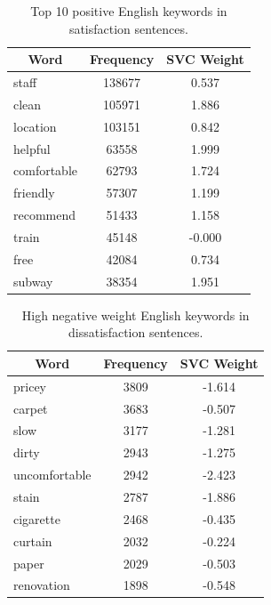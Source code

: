 \begin{table}[hbp]
\centering
\caption{Top 10 positive English keywords in satisfaction sentences.}
\label{tab:pos_keys_en}
\begin{tabular}{|l|c|c|}
\hline
\multicolumn{1}{|c|}{\textbf{Word}} & \textbf{Frequency} & \textbf{SVC Weight} \\ \hline
staff & 138677 & 0.537 \\ \hline
clean & 105971 & 1.886 \\ \hline
location & 103151 & 0.842 \\ \hline
helpful & 63558 & 1.999 \\ \hline
comfortable & 62793 & 1.724 \\ \hline
friendly & 57307 & 1.199 \\ \hline
recommend & 51433 & 1.158 \\ \hline
train & 45148 & -0.000 \\ \hline
free & 42084 & 0.734 \\ \hline
subway & 38354 & 1.951 \\ \hline
\end{tabular}
\end{table}


\begin{table}[hbp]
\centering
\caption{High negative weight English keywords in dissatisfaction sentences.}
\label{tab:neg_keys_en}
\begin{tabular}{|l|c|c|}
\hline
\multicolumn{1}{|c|}{\textbf{Word}} & \textbf{Frequency} & \textbf{SVC Weight} \\ \hline
pricey & 3809 & -1.614 \\ \hline
carpet & 3683 & -0.507 \\ \hline
slow & 3177 & -1.281 \\ \hline
dirty & 2943 & -1.275 \\ \hline
uncomfortable & 2942 & -2.423 \\ \hline
stain & 2787 & -1.886 \\ \hline
cigarette & 2468 & -0.435 \\ \hline
curtain & 2032 & -0.224 \\ \hline
paper & 2029 & -0.503 \\ \hline
renovation & 1898 & -0.548 \\ \hline
\end{tabular}
\end{table}

